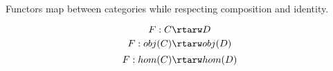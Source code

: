 
\begin{definition}

  Functors map between categories while respecting composition and identity.

  $$ F : C \rtarw D $$
  $$ F : obj(C) \rtarw obj(D) $$
  $$ F : hom(C) \rtarw hom(D) $$

\end{definition}



